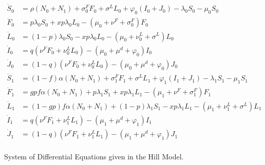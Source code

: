\documentclass{amsart}
\begin{document}
\begin{figure}
  \begin{align*}
    \dot{S}_0 &= \rho(N_0+N_1) + \sigma_0^FF_0 + \sigma^LL_0 
                +\varphi_0(I_0+J_0) - \lambda_0 S_0 - \mu_0 S_0\\
    \dot{F}_0 &= p\lambda_0S_0 + xp\lambda_0L_0 - (\mu_0+\nu^F+\sigma_0^F)F_0\\
    \dot{L}_0 &= (1-p)\lambda_0S_0 - xp\lambda_0L_0 
                -(\mu_0+\nu_0^L+\sigma^L)L_0\\
    \dot{I}_0 &= q(\nu^FF_0 + \nu_0^LL_0) - (\mu_0+\mu^d+\varphi_0)I_0\\
    \dot{J}_0 &= (1-q)(\nu^FF_0 + \nu_0^LL_0) - (\mu_0+\mu^d+\varphi_0)J_0\\
    \dot{S}_1 &= (1-f)\alpha(N_0+N_1) + \sigma_1^FF_1 + \sigma^LL_1 
                +\varphi_1(I_1+J_1) - \lambda_1S_1 - \mu_1S_1\\
    \dot{F}_1 &= gpf\alpha(N_0+N_1) + p\lambda_1S_1 + xp\lambda_1L_1 
                -(\mu_1+\nu^F+\sigma_1^F)F_1\\
    \dot{L}_1 &= (1-gp)f\alpha(N_0+N_1) + (1-p)\lambda_1S_1 - xp\lambda_1L_1 
                -(\mu_1+\nu_1^L+\sigma^L)L_1\\
    \dot{I}_1 &= q(\nu^FF_1 + \nu_1^LL_1) - (\mu_1+\mu^d+\varphi_1)I_1\\
    \dot{J}_1 &= (1-q)(\nu^FF_1 + \nu_1^LL_1) - (\mu_1+\mu^d+\varphi_1)J_1\\
  \end{align*}
  \caption{System of Differential Equations given in the Hill Model.}
  \label{fig:hillEquations}
\end{figure}
\end{document}
